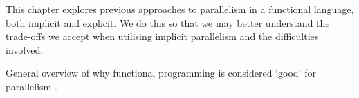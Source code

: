 This chapter explores previous approaches to parallelism in a
functional language, both implicit and explicit. We do this so that
we may better understand the trade-offs we accept when utilising
implicit parallelism and the difficulties involved.


General overview of why functional programming is considered `good' for
parallelism \citep{hughes:thesis}.
